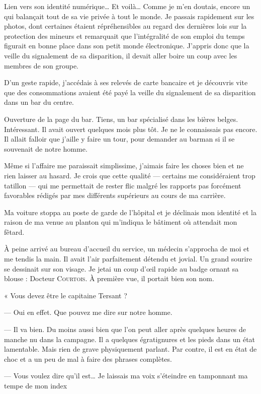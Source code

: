Lien vers son identité numérique… Et voilà… Comme je m'en doutais, encore un qui balançait tout de sa vie privée à tout
le monde. Je passais rapidement sur les photos, dont certaines étaient répréhensibles au regard des dernières lois sur
la protection des mineurs et remarquait que l'intégralité de son emploi du temps figurait en bonne place dans son petit
monde électronique. J'appris donc que la veille du signalement de sa disparition, il devait aller boire un coup avec
les membres de son groupe.

D'un geste rapide, j'accédais à ses relevés de carte bancaire et je découvris vite que des consommations avaient été
payé la veille du signalement de sa disparition dans un bar du centre.

Ouverture de la page du bar. Tiens, un bar spécialisé dans les bières belges. Intéressant. Il avait ouvert quelques
mois plus tôt. Je ne le connaissais pas encore. Il allait falloir que j'aille y faire un tour, pour demander au barman
si il se souvenait de notre homme.

Même si l'affaire me paraissait simplissime, j'aimais faire les choses bien et ne rien laisser au hasard. Je crois que
cette qualité — certains me considéraient trop tatillon — qui me permettait de rester flic malgré les rapports pas
forcément favorables rédigés par mes différents supérieurs au cours de ma carrière.

Ma voiture stoppa au poste de garde de l'hôpital et je déclinais mon identité et la raison de ma venue au planton qui
m'indiqua le bâtiment où attendait mon fêtard.

À peine arrivé au bureau d'accueil du service, un médecin s'approcha de moi et me tendis la main.
Il avait l'air parfaitement détendu et jovial. Un grand sourire se dessinait sur son visage. Je jetai un coup d'œil
rapide au badge ornant sa blouse : Docteur \textsc{Courtois}. À première vue, il portait bien son nom.

« Vous devez être le capitaine Tersant ?

— Oui en effet. Que pouvez me dire sur notre homme.

— Il va bien. Du moins aussi bien que l'on peut aller après quelques heures de manche nu dans la campagne. Il a
quelques égratignures et les pieds dans un état lamentable. Mais rien de grave physiquement parlant. Par contre, il est
en état de choc et a un peu de mal à faire des phrases complètes.

— Vous voulez dire qu'il est… Je laissais ma voix s'éteindre en tamponnant ma tempe de mon index

